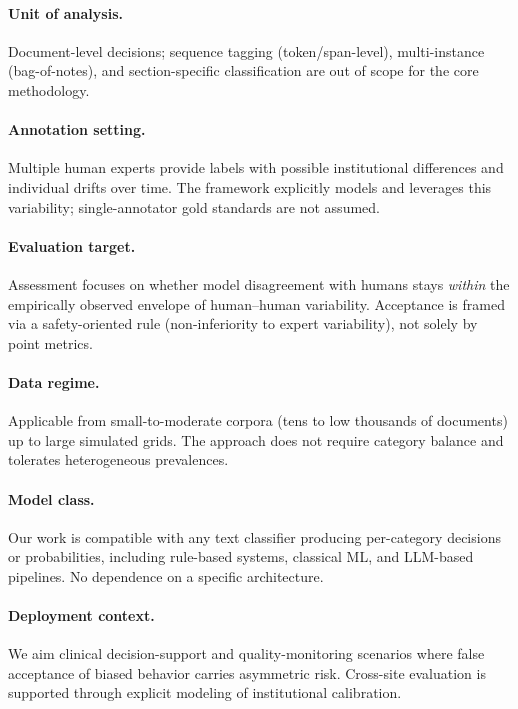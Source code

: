 \documentclass[12pt]{article}
\begin{document}
\paragraph{Unit of analysis.}
Document-level decisions; sequence tagging (token/span-level), multi-instance (bag-of-notes), and section-specific classification are out of scope for the core methodology.

\paragraph{Annotation setting.}
Multiple human experts provide labels with possible institutional differences and individual drifts over time. The framework explicitly models and leverages this variability; single-annotator gold standards are not assumed.

\paragraph{Evaluation target.}
Assessment focuses on whether model disagreement with humans stays \emph{within} the empirically observed envelope of human–human variability. Acceptance is framed via a safety-oriented rule (non-inferiority to expert variability), not solely by point metrics.

\paragraph{Data regime.}
Applicable from small-to-moderate corpora (tens to low thousands of documents) up to large simulated grids. The approach does not require category balance and tolerates heterogeneous prevalences.

\paragraph{Model class.}
Our work is compatible with any text classifier producing per-category decisions or probabilities, including rule-based systems, classical ML, and LLM-based pipelines. No dependence on a specific architecture.

\paragraph{Deployment context.}
We aim clinical decision-support and quality-monitoring scenarios where false acceptance of biased behavior carries asymmetric risk. Cross-site evaluation is supported through explicit modeling of institutional calibration.
\end{document}
